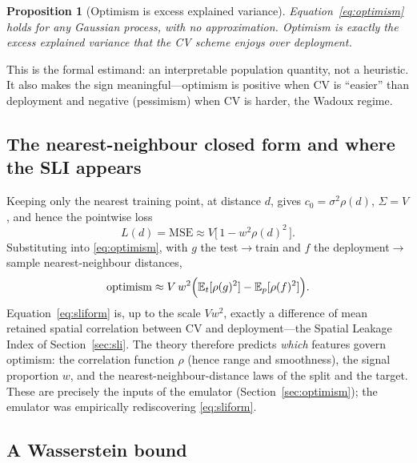 \documentclass[11pt,a4paper]{article}
\newtheorem{proposition}{Proposition}
\newcommand{\E}{\mathbb{E}}
\begin{document}
\begin{proposition}[Optimism is excess explained variance]
Equation~\eqref{eq:optimism} holds for \emph{any} Gaussian process, with no
approximation. Optimism is exactly the excess explained variance that the CV scheme
enjoys over deployment.
\end{proposition}

\noindent This is the formal estimand: an interpretable population quantity, not a
heuristic. It also makes the sign meaningful---optimism is positive when CV is
``easier'' than deployment and negative (pessimism) when CV is harder, the Wadoux
regime.

\subsection{The nearest-neighbour closed form and where the SLI appears}

Keeping only the nearest training point, at distance $d$, gives
$c_0=\sigma^2\rho(d)$, $\Sigma=V$, and hence the pointwise loss
\begin{equation}\label{eq:Ld}
L(d)=\mathrm{MSE}\approx V\bigl[\,1-w^2\rho(d)^2\,\bigr].
\end{equation}
Substituting into \eqref{eq:optimism}, with $g$ the test$\to$train and $f$ the
deployment$\to$sample nearest-neighbour distances,
\begin{equation}\label{eq:sliform}
\text{optimism}\approx V\,w^2\Bigl(\E_t[\rho(g)^2]-\E_p[\rho(f)^2]\Bigr).
\end{equation}
Equation~\eqref{eq:sliform} is, up to the scale $Vw^2$, exactly a difference of mean
retained spatial correlation between CV and deployment---the Spatial Leakage Index
of Section~\ref{sec:sli}. The theory therefore predicts \emph{which} features govern
optimism: the correlation function $\rho$ (hence range and smoothness), the signal
proportion $w$, and the nearest-neighbour-distance laws of the split and the
target. These are precisely the inputs of the emulator
(Section~\ref{sec:optimism}); the emulator was empirically rediscovering
\eqref{eq:sliform}.

\subsection{A Wasserstein bound}
\end{document}
